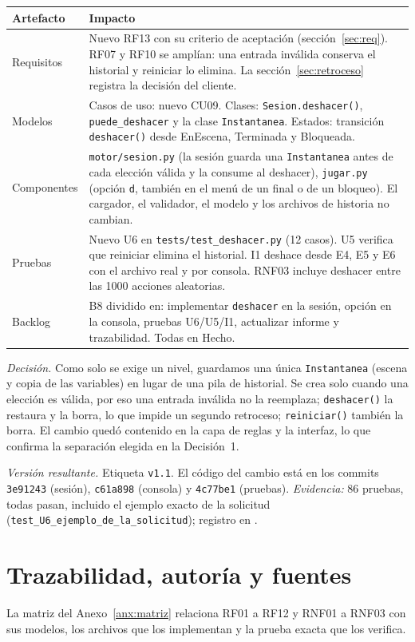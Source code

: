 \documentclass[11pt,letterpaper]{article}
\newcommand{\cod}[1]{\texttt{#1}}
\begin{document}
\begin{tabularx}{\linewidth}{@{}lL@{}}
\toprule
Artefacto & Impacto\\ \midrule
Requisitos & Nuevo RF13 con su criterio de aceptación (sección~\ref{sec:req}). RF07 y RF10 se amplían: una entrada inválida conserva el historial y reiniciar lo elimina. La sección~\ref{sec:retroceso} registra la decisión del cliente.\\
Modelos & Casos de uso: nuevo CU09. Clases: \cod{Sesion.deshacer()}, \cod{puede\_deshacer} y la clase \cod{Instantanea}. Estados: transición \cod{deshacer()} desde EnEscena, Terminada y Bloqueada.\\
Componentes & \cod{motor/sesion.py} (la sesión guarda una \cod{Instantanea} antes de cada elección válida y la consume al deshacer), \cod{jugar.py} (opción \cod{d}, también en el menú de un final o de un bloqueo). El cargador, el validador, el modelo y los archivos de historia no cambian.\\
Pruebas & Nuevo U6 en \cod{tests/test\_deshacer.py} (12 casos). U5 verifica que reiniciar elimina el historial. I1 deshace desde E4, E5 y E6 con el archivo real y por consola. RNF03 incluye deshacer entre las 1000 acciones aleatorias.\\
Backlog & B8 dividido en: implementar \cod{deshacer} en la sesión, opción en la consola, pruebas U6/U5/I1, actualizar informe y trazabilidad. Todas en Hecho.\\ \bottomrule
\end{tabularx}

\textit{Decisión.} Como solo se exige un nivel, guardamos una única \cod{Instantanea} (escena y copia de las variables) en lugar de una pila de historial. Se crea solo cuando una elección es válida, por eso una entrada inválida no la reemplaza; \cod{deshacer()} la restaura y la borra, lo que impide un segundo retroceso; \cod{reiniciar()} también la borra. El cambio quedó contenido en la capa de reglas y la interfaz, lo que confirma la separación elegida en la Decisión~1.

\textit{Versión resultante.} Etiqueta \cod{v1.1}. El código del cambio está en los commits \cod{3e91243} (sesión), \cod{c61a898} (consola) y \cod{4c77be1} (pruebas). \textit{Evidencia:} 86 pruebas, todas pasan, incluido el ejemplo exacto de la solicitud (\cod{test\_U6\_ejemplo\_de\_la\_solicitud}); registro en .

\section{Trazabilidad, autoría y fuentes}\label{sec:fuentes}
La matriz del Anexo~\ref{anx:matriz} relaciona RF01 a RF12 y RNF01 a RNF03 con sus modelos, los archivos que los implementan y la prueba exacta que los verifica.
\end{document}

